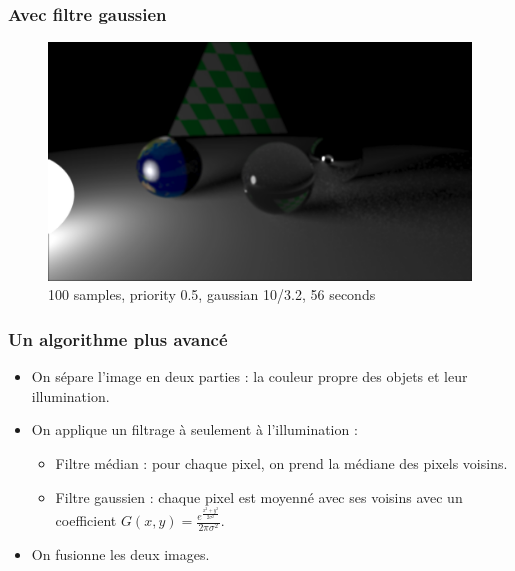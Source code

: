 \documentclass[handout]{beamer}
\begin{document}
\begin{frame}
    \frametitle{Avec filtre gaussien}

    \begin{figure}
        \includegraphics[scale=0.25]{gaussian10.png}
        \caption{100 samples, priority 0.5, gaussian 10/3.2, 56 seconds}
    \end{figure}

\end{frame}

\begin{frame}
    \frametitle{Un algorithme plus avancé}

    \begin{itemize}
        \item On sépare l'image en deux parties : la couleur propre des objets et leur illumination.
        \item On applique un filtrage à seulement à l'illumination :
        \begin{itemize}
            \item Filtre médian : pour chaque pixel, on prend la médiane des pixels voisins.
            \item Filtre gaussien : chaque pixel est moyenné avec ses voisins avec un coefficient
                $ G(x,y) = \frac{ e^{ \frac{x^2+y^2}{2 \sigma^2} } }{2 \pi \sigma^2} $.
        \end{itemize}
        \item On fusionne les deux images.
    \end{itemize}

\end{frame}
\end{document}
